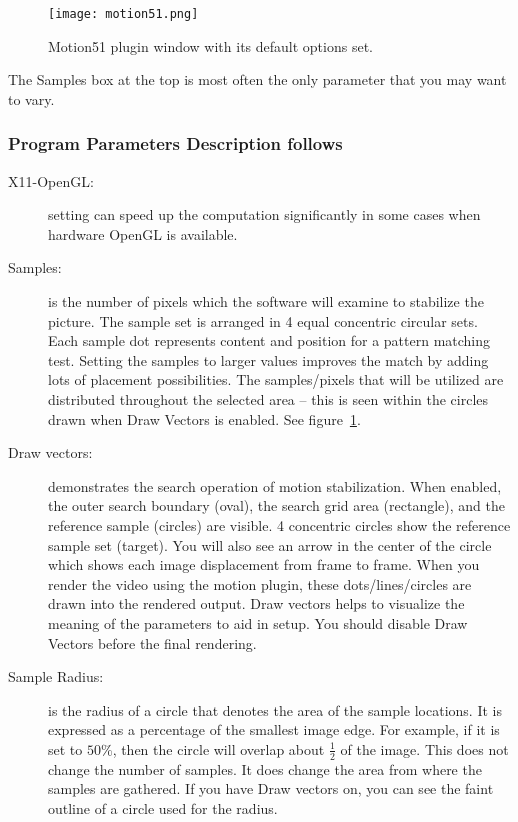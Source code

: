 \begin{figure}[htpb]
    \centering
    \texttt{[image: motion51.png]}
    \caption{Motion51 plugin window with its default options set.}
    \label{fig:motion51}
\end{figure}

The Samples box at the top is most often the only parameter that you may want to vary.

\subsubsection*{Program Parameters Description follows}
\label{ssub:program_parameters_description}

\begin{description}
    \item[X11-OpenGL:] setting can speed up the computation significantly in some cases when hardware OpenGL is available.
    \item[Samples:] is the number of pixels which the software will examine to stabilize the picture. The sample set is arranged in 4 equal concentric circular sets. Each sample dot represents content and position for a pattern matching test. Setting the samples to larger values improves the match by adding lots of placement possibilities. The samples/pixels that will be utilized are distributed throughout the selected area -- this is seen within the circles drawn when Draw Vectors is enabled. See figure~\ref{fig:motion51}.
    \item[Draw vectors:] demonstrates the search operation of motion stabilization. When enabled, the outer search boundary (oval), the search grid area (rectangle), and the reference sample (circles) are visible. 4 concentric circles show the reference sample set (target). You will also see an arrow in the center of the circle which shows each image displacement from frame to frame. When you render the video using the motion plugin, these dots/lines/circles are drawn into the rendered output. Draw vectors helps to visualize the meaning of the parameters to aid in setup. You should disable Draw Vectors before the final rendering.
    \item[Sample Radius:] is the radius of a circle that denotes the area of the sample locations. It is expressed as a percentage of the smallest image edge. For example, if it is set to $50\%$, then the circle will overlap about $\frac{1}{2}$ of the image. This does not change the number of samples. It does change the area from where the samples are gathered. If you have Draw vectors on, you can see the faint outline of a circle used for the radius.

\end{description}

